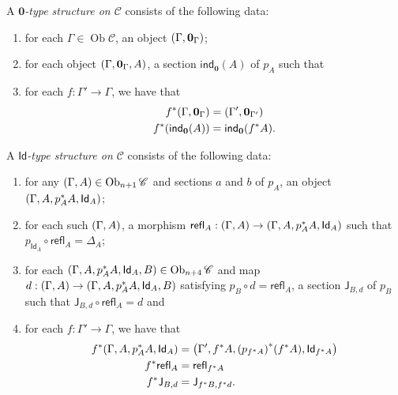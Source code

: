 \documentclass[10pt,letterpaper,cm]{nupset}
\theoremstyle{definition}
\theoremstyle{theorem}
\theoremstyle{remark}
\DeclareMathOperator{\ob}{Ob}
\newcommand{\J}{\mathsf{J}}
\newcommand{\id}{\mathsf{Id}}
\newcommand{\refl}{\mathsf{refl}}
\newcommand{\ind}{\mathsf{ind}}
\newcommand{\0}{\mathbf{0}}
\newcommand{\1}{\mathbf{1}}
\newcommand{\2}{\mathbf{2}}
\renewcommand{\c}{\mathscr{C}}
\newcommand{\be}{\begin{enumerate}}
\newcommand{\ee}{\end{enumerate}}
\begin{document}
\medskip

A \textit{$\0$-type structure on $\c$} consists of the following data:
\be[label=(\roman*)]
\item for each $\Gamma \in \ob{\c}$, an object $\mleft(\Gamma, \0_{\Gamma}\mright)$; 
\item for each object $\mleft(\Gamma, \0_{\Gamma}, A\mright)$, a section $\ind_{\0}(A)$ of $p_A$ such that
\item for each $f: \Gamma' \to \Gamma$, we have that
\begin{align*}
f^{\ast}(\Gamma, \0_{\Gamma}) & = \mleft(\Gamma', \0_{\Gamma'}\mright)
\\ f^{\ast}(\ind_{\0}(A)) & = \ind_{\0}(f^{\ast}{A}).
\end{align*}
\ee

\medskip

A \textit{$\id$-type structure on $\c$} consists of the following data:\label{idtype}
\be[label=(\roman*)]
\item for any $\mleft(\Gamma, A\mright)\in \ob_{n+1}{\c}$ and sections $a$ and $b$ of $p_A$, an object $\mleft(\Gamma, A, p_A^{\ast}{A}, \id_A\mright)$;
\item for each such $\mleft(\Gamma, A\mright)$, a morphism $\refl_A :\mleft(\Gamma, A\mright) \to \mleft(\Gamma, A, p_A^{\ast}{A}, \id_A\mright)$ such that $p_{\id_A} \circ \refl_A = \Delta_A$;
\item for each $\mleft(\Gamma, A, p_A^{\ast}{A}, \id_A, B\mright)\in \ob_{n+4}{\c}$ and map $d: \mleft(\Gamma, A\mright) \to \mleft(\Gamma, A, p_A^{\ast}{A}, \id_A, B\mright)$ satisfying $p_B \circ d = \refl_A$, a section $\J_{B,d}$ of $p_B$ such that $\J_{B,d} \circ \refl_A =d$ and
\item for each $f: \Gamma' \to \Gamma$, we have that
\begin{align*}
f^{\ast}(\Gamma, A, p_A^{\ast}{A}, \id_A)  & = \mleft(\Gamma', f^{\ast}{A}, \mleft(p_{f^{\ast}{A}}\mright)^{\ast}(f^{\ast}{A}), \id_{f^{\ast}{A}}\mright)
\\  f^{\ast}{\refl_A} & = \refl_{f^{\ast}{A}}
\\ f^{\ast}{\J_{B,d}} & = \J_{f^{\ast}{B}, f^{\ast}{d}}.
\end{align*}
\ee
\end{document}
